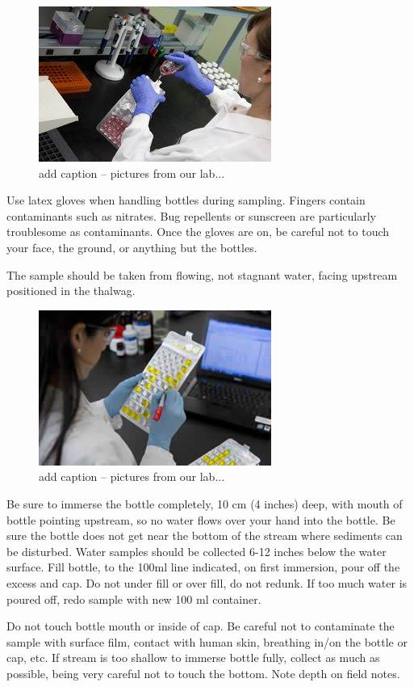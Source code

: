 \documentclass[12pt]{../SOP4_alpha}\usepackage[]{graphicx}\usepackage[]{color}
\begin{document}
\begin{figure}
\includegraphics{Step2.jpg}
\caption{add caption -- pictures from our lab...}
\end{figure}


\NP Use latex gloves when handling bottles during sampling. Fingers contain
contaminants such as nitrates. Bug repellents or sunscreen are particularly troublesome as contaminants. Once the gloves are on, be careful not to touch
your face, the ground, or anything but the bottles.

\NP The sample should be taken from flowing, not stagnant water, facing
upstream positioned in the thalwag.


\begin{figure}
\includegraphics{Step3.jpg}
\caption{add caption -- pictures from our lab...}
\end{figure}

\NP Be sure to immerse the bottle completely, 10 cm (4 inches) deep, with
mouth of bottle pointing upstream, so no water flows over your hand into the
bottle. Be sure the bottle does not get near the bottom of the stream where
sediments can be disturbed. Water samples should be collected 6-12 inches
below the water surface. Fill bottle, to the 100ml line indicated, on first
immersion, pour off the excess and cap. Do not under fill or over fill, do not
redunk. If too much water is poured off, redo sample with new 100 ml
container.

\NP Do not touch bottle mouth or inside of cap. Be careful not to
contaminate the sample with surface film, contact with human skin, breathing
in/on the bottle or cap, etc. If stream is too shallow to immerse bottle fully,
collect as much as possible, being very careful not to touch the bottom. Note
depth on field notes.
\end{document}
